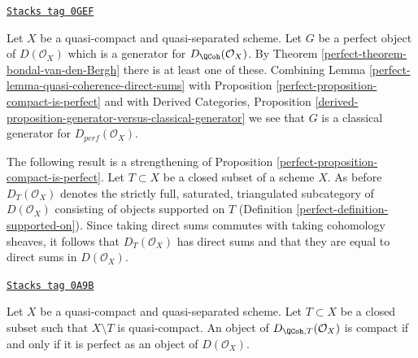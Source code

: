 \begin{remark}
\label{perfect-remark-classical-generator}
\href{https://stacks.math.columbia.edu/tag/0GEF}{\texttt{Stacks tag 0GEF}}

Let $X$ be a quasi-compact and quasi-separated scheme. Let $G$ be a
perfect object of $D(\mathcal{O}_X)$ which is a generator for
$D_\QCoh(\mathcal{O}_X)$. By Theorem \ref{perfect-theorem-bondal-van-den-Bergh}
there is at least one of these. Combining
Lemma \ref{perfect-lemma-quasi-coherence-direct-sums} with
Proposition \ref{perfect-proposition-compact-is-perfect} and with
Derived Categories, Proposition
\ref{derived-proposition-generator-versus-classical-generator}
we see that $G$ is a classical generator for $D_{perf}(\mathcal{O}_X)$.
\end{remark}

The following result is a strengthening of
Proposition \ref{perfect-proposition-compact-is-perfect}.
Let $T \subset X$ be a closed subset of a scheme $X$. As before
$D_T(\mathcal{O}_X)$ denotes the strictly full, saturated,
triangulated subcategory of $D(\mathcal{O}_X)$ consisting of objects
supported on $T$ (Definition \ref{perfect-definition-supported-on}).
Since taking direct sums commutes with taking cohomology sheaves, it follows
that $D_T(\mathcal{O}_X)$ has direct sums and that they are equal
to direct sums in $D(\mathcal{O}_X)$.

\begin{lemma}
\label{perfect-lemma-compact-is-perfect-with-support}
\href{https://stacks.math.columbia.edu/tag/0A9B}{\texttt{Stacks tag 0A9B}}

Let $X$ be a quasi-compact and quasi-separated scheme.
Let $T \subset X$ be a closed subset such that $X \setminus T$
is quasi-compact. An object of $D_{\QCoh, T}(\mathcal{O}_X)$ is compact
if and only if it is perfect as an object of $D(\mathcal{O}_X)$.
\end{lemma}

